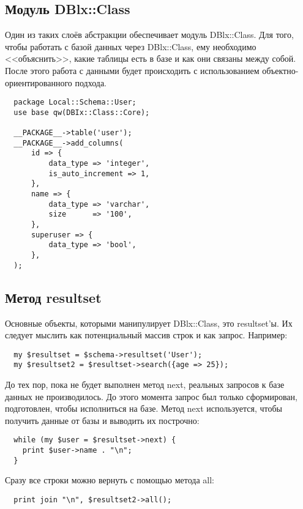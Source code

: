 \subsection{Модуль DBlx::Class}
Один из таких слоёв абстракции обеспечивает модуль DBlx::Class. Для того, чтобы работать с базой данных через DBlx::Class, ему необходимо <<объяснить>>, какие таблицы есть в базе и как они связаны между собой. После этого работа с данными будет происходить с использованием объектно-ориентированного подхода.
\begin{verbatim}
  package Local::Schema::User;
  use base qw(DBIx::Class::Core);

  __PACKAGE__->table('user');
  __PACKAGE__->add_columns(
      id => {
          data_type => 'integer',
          is_auto_increment => 1,
      },
      name => {
          data_type => 'varchar',
          size      => '100',
      },
      superuser => {
          data_type => 'bool',
      },
  );
\end{verbatim}

\subsection{Метод resultset}
Основные объекты, которыми манипулирует DBlx::Class, это resultset'ы. Их следует мыслить как потенциальный массив строк и как запрос. Например:
\begin{verbatim}
  my $resultset = $schema->resultset('User');
  my $resultset2 = $resultset->search({age => 25});
\end{verbatim}
До тех пор, пока не будет выполнен метод next, реальных запросов к базе данных не производилось. До этого момента запрос был только сформирован, подготовлен, чтобы исполниться на базе. Метод next используется, чтобы получить данные от базы и выводить их построчно:
\begin{verbatim}
  while (my $user = $resultset->next) {
    print $user->name . "\n";
  }
\end{verbatim}
Сразу все строки можно вернуть с помощью метода all:
\begin{verbatim}
  print join "\n", $resultset2->all();
\end{verbatim}


